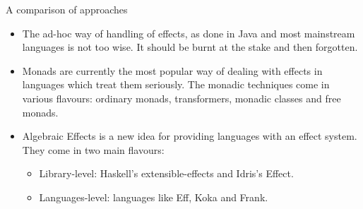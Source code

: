 \documentclass{beamer}
\begin{document}
\begin{frame}{A comparison of approaches}
\begin{itemize}
	\item The ad-hoc way of handling of effects, as done in Java and most mainstream languages is not too wise. It should be burnt at the stake and then forgotten.
	\item Monads are currently the most popular way of dealing with effects in languages which treat them seriously. The monadic techniques come in various flavours: ordinary monads, transformers, monadic classes and free monads.
	\item Algebraic Effects is a new idea for providing languages with an effect system. They come in two main flavours:
	\begin{itemize}
		\item Library-level: Haskell's extensible-effects and Idris's Effect.
		\item Languages-level: languages like Eff, Koka and Frank.
	\end{itemize}
\end{itemize}
\end{frame}
\end{document}
